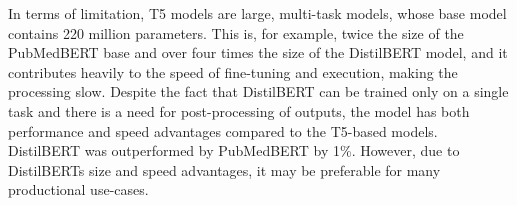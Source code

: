 \documentclass[final,12pt,3p,times,twocolumn,authoryear]{elsarticle}
\begin{document}
In terms of limitation, T5 models are large, multi-task models, whose base model contains 220 million parameters. This is, for example, twice the size of the PubMedBERT base and over four times the size of the DistilBERT model, and it contributes heavily to the speed of fine-tuning and execution, making the processing slow. Despite the fact that DistilBERT can be trained only on a single task and there is a need for post-processing of outputs, the model has both performance and speed advantages compared to the T5-based models. DistilBERT was outperformed by PubMedBERT by 1\%. However, due to DistilBERTs size and speed advantages, it may be preferable for many productional use-cases.   










 

\end{document}
